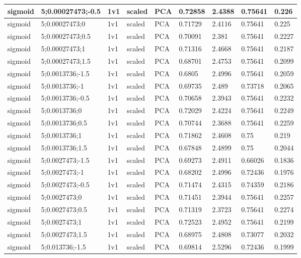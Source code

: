 \begin{longtable}{lllllllll}
sigmoid & 5;0.00027473;-0.5 & 1v1 & scaled & PCA & 0.72858 & 2.4388 & 0.75641 & 0.226\\ \hline
sigmoid & 5;0.00027473;0 & 1v1 & scaled & PCA & 0.71729 & 2.4116 & 0.75641 & 0.225\\ \hline
sigmoid & 5;0.00027473;0.5 & 1v1 & scaled & PCA & 0.70091 & 2.381 & 0.75641 & 0.2227\\ \hline
sigmoid & 5;0.00027473;1 & 1v1 & scaled & PCA & 0.71316 & 2.4668 & 0.75641 & 0.2187\\ \hline
sigmoid & 5;0.00027473;1.5 & 1v1 & scaled & PCA & 0.68701 & 2.4753 & 0.75641 & 0.2099\\ \hline
sigmoid & 5;0.0013736;-1.5 & 1v1 & scaled & PCA & 0.6805 & 2.4996 & 0.75641 & 0.2059\\ \hline
sigmoid & 5;0.0013736;-1 & 1v1 & scaled & PCA & 0.69735 & 2.489 & 0.73718 & 0.2065\\ \hline
sigmoid & 5;0.0013736;-0.5 & 1v1 & scaled & PCA & 0.70658 & 2.3943 & 0.75641 & 0.2232\\ \hline
sigmoid & 5;0.0013736;0 & 1v1 & scaled & PCA & 0.72029 & 2.4224 & 0.75641 & 0.2249\\ \hline
sigmoid & 5;0.0013736;0.5 & 1v1 & scaled & PCA & 0.70744 & 2.3688 & 0.75641 & 0.2259\\ \hline
sigmoid & 5;0.0013736;1 & 1v1 & scaled & PCA & 0.71862 & 2.4608 & 0.75 & 0.219\\ \hline
sigmoid & 5;0.0013736;1.5 & 1v1 & scaled & PCA & 0.67848 & 2.4899 & 0.75 & 0.2044\\ \hline
sigmoid & 5;0.0027473;-1.5 & 1v1 & scaled & PCA & 0.69273 & 2.4911 & 0.66026 & 0.1836\\ \hline
sigmoid & 5;0.0027473;-1 & 1v1 & scaled & PCA & 0.68202 & 2.4996 & 0.72436 & 0.1976\\ \hline
sigmoid & 5;0.0027473;-0.5 & 1v1 & scaled & PCA & 0.71474 & 2.4315 & 0.74359 & 0.2186\\ \hline
sigmoid & 5;0.0027473;0 & 1v1 & scaled & PCA & 0.71451 & 2.3944 & 0.75641 & 0.2257\\ \hline
sigmoid & 5;0.0027473;0.5 & 1v1 & scaled & PCA & 0.71319 & 2.3723 & 0.75641 & 0.2274\\ \hline
sigmoid & 5;0.0027473;1 & 1v1 & scaled & PCA & 0.72523 & 2.4952 & 0.75641 & 0.2199\\ \hline
sigmoid & 5;0.0027473;1.5 & 1v1 & scaled & PCA & 0.68975 & 2.4808 & 0.73077 & 0.2032\\ \hline
sigmoid & 5;0.013736;-1.5 & 1v1 & scaled & PCA & 0.69814 & 2.5296 & 0.72436 & 0.1999\\ \hline

\end{longtable}
